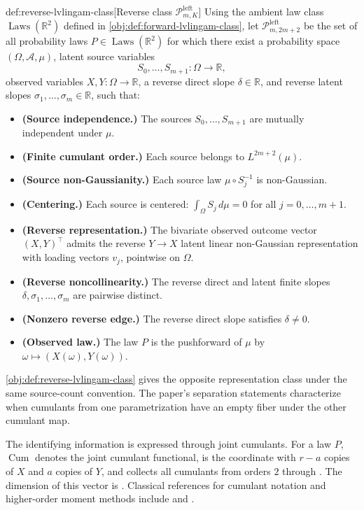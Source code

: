 \documentclass[11pt]{article}
\begin{document}
\begin{definitionv}{def:reverse-lvlingam-class}[Reverse class \(\mathcal P^{\mathrm{left}}_{m,K}\)]
Using the ambient law class \(\operatorname{Laws}(\mathbb R^2)\) defined in \cref{obj:def:forward-lvlingam-class}, let \(\mathcal P^{\mathrm{left}}_{m,2m+2}\) be the set of all probability laws \(P\in \operatorname{Laws}(\mathbb R^2)\) for which there exist a probability space \((\Omega,\mathcal A,\mu)\), latent source variables
\[
S_0,\ldots,S_{m+1}:\Omega\to\mathbb R,
\]
observed variables \(X,Y:\Omega\to\mathbb R\), a reverse direct slope \(\delta\in\mathbb R\), and reverse latent slopes \(\sigma_1,\ldots,\sigma_m\in\mathbb R\), such that:
\begin{itemize}
\item \textbf{(Source independence.)} The sources \(S_0,\ldots,S_{m+1}\) are mutually independent under \(\mu\).
\item \textbf{(Finite cumulant order.)} Each source belongs to \(L^{2m+2}(\mu)\).
\item \textbf{(Source non-Gaussianity.)} Each source law \(\mu\circ S_j^{-1}\) is non-Gaussian.
\item \textbf{(Centering.)} Each source is centered: \(\int_\Omega S_j\,d\mu=0\) for all \(j=0,\ldots,m+1\).
\item \textbf{(Reverse representation.)} The bivariate observed outcome vector \((X,Y)^\top\) admits the reverse \(Y\to X\) latent linear non-Gaussian representation with loading vectors \(v_j\), pointwise on \(\Omega\).
\item \textbf{(Reverse noncollinearity.)} The reverse direct and latent finite slopes \(\delta,\sigma_1,\ldots,\sigma_m\) are pairwise distinct.
\item \textbf{(Nonzero reverse edge.)} The reverse direct slope satisfies \(\delta\ne 0\).
\item \textbf{(Observed law.)} The law \(P\) is the pushforward of \(\mu\) by \(\omega\mapsto (X(\omega),Y(\omega))\).
\end{itemize}
\end{definitionv}

\cref{obj:def:reverse-lvlingam-class} gives the opposite representation class under the same source-count convention. The paper's separation statements characterize when cumulants from one parametrization have an empty fiber under the other cumulant map.

The identifying information is expressed through joint cumulants. For a law \(P\), \(\operatorname{Cum}\) denotes the joint cumulant functional,  is the coordinate with \(r-a\) copies of \(X\) and \(a\) copies of \(Y\), and  collects all cumulants from orders \(2\) through . The dimension of this vector is . Classical references for cumulant notation and higher-order moment methods include \citet{Brillinger1969} and \citet{McCullagh1987}.
\end{document}

